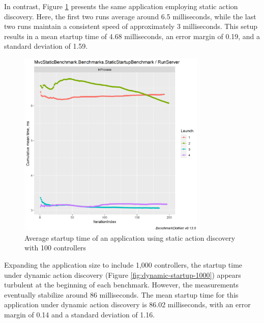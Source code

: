 In contrast, Figure \ref{fig:static-startup-100} presents the same application employing static action discovery. Here, the first two runs average around 6.5 milliseconds, while the last two runs maintain a consistent speed of approximately 3 milliseconds. This setup results in a mean startup time of 4.68 milliseconds, an error margin of 0.19, and a standard deviation of 1.59.

\begin{figure}[H]
\centering
\includegraphics[width=0.8\textwidth]{graphics/MvcStaticBenchmark.Benchmarks.StaticStartupBenchmark-RunServer-cummean.png}
\caption{Average startup time of an application using static action discovery with 100 controllers}
\label{fig:static-startup-100}
\end{figure}

Expanding the application size to include 1,000 controllers, the startup time under dynamic action discovery (Figure \ref{fig:dynamic-startup-1000}) appears turbulent at the beginning of each benchmark. However, the measurements eventually stabilize around 86 milliseconds. The mean startup time for this application under dynamic action discovery is 86.02 milliseconds, with an error margin of 0.14 and a standard deviation of 1.16.


